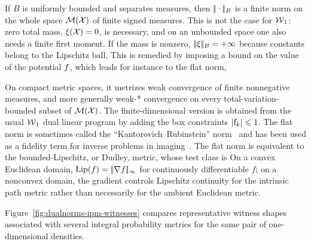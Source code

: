 \begin{example}
If $B$ is uniformly bounded and separates measures, then $|\!| \cdot |\!|_B$ is a finite norm on the whole space $\mathcal{M}(\mathcal{X})$ of finite signed measures.
%
This is not the case for $\operatorname{\mathcal{W}}_1$: zero total mass, $\xi(\mathcal{X})=0$, is necessary, and on an unbounded space one also needs a finite first moment. If the mass is nonzero, $|\!| \xi |\!|_B=+\infty$ because constants belong to the Lipschitz ball.
%
This is remedied by imposing a bound on the value of the potential $f$, which leads for instance to the flat norm,

On compact metric spaces, it metrizes weak convergence of finite nonnegative measures, and more generally weak-* convergence on every total-variation-bounded subset of $\mathcal{M}(\mathcal{X})$.
%
The finite-dimensional version is obtained from the usual $\operatorname{\mathcal{W}}_1$ dual linear program by adding the box constraints $\left\lvert\mathrm{f}_k\right\rvert\leqslant1$.
%
The flat norm is sometimes called the ``Kantorovich--Rubinstein'' norm~\cite{hanin1992kantorovich} and has been used as a fidelity term for inverse problems in imaging~\cite{lellmann2014imaging}.
%
The flat norm is equivalent to the bounded-Lipschitz, or Dudley, metric, whose test class is
On a convex Euclidean domain, $\operatorname{Lip}(f)=|\!| \nabla f |\!|_\infty$ for continuously differentiable $f$; on a nonconvex domain, the gradient controls Lipschitz continuity for the intrinsic path metric rather than necessarily for the ambient Euclidean metric.
\end{example}

Figure~\ref{fig:dualnorms-ipm-witnesses} compares representative witness shapes associated with several integral probability metrics for the same pair of one-dimensional densities.

